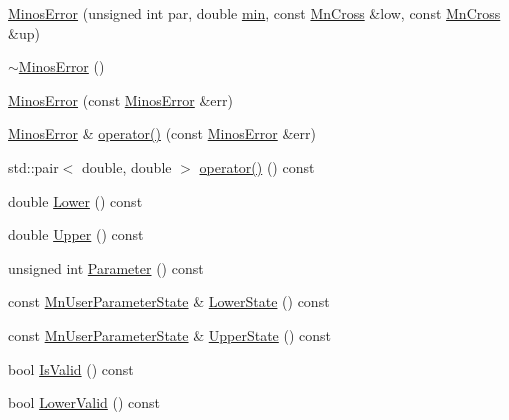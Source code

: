 \begin{DoxyCompactItemize}
\item 
\mbox{\hyperlink{classROOT_1_1Minuit2_1_1MinosError_a400609986f7b4e3a93eab1a35e1f33ce}{Minos\+Error}} (unsigned int par, double \mbox{\hyperlink{SU3__internal_8h_ab0f5fed3171eb00d1c5f037d9f518a23}{min}}, const \mbox{\hyperlink{classROOT_1_1Minuit2_1_1MnCross}{Mn\+Cross}} \&low, const \mbox{\hyperlink{classROOT_1_1Minuit2_1_1MnCross}{Mn\+Cross}} \&up)
\item 
\mbox{\hyperlink{classROOT_1_1Minuit2_1_1MinosError_a8373afe22cd395ed995a061691c48dad}{$\sim$\+Minos\+Error}} ()
\item 
\mbox{\hyperlink{classROOT_1_1Minuit2_1_1MinosError_a95d558825494f594da873fef3518572e}{Minos\+Error}} (const \mbox{\hyperlink{classROOT_1_1Minuit2_1_1MinosError}{Minos\+Error}} \&err)
\item 
\mbox{\hyperlink{classROOT_1_1Minuit2_1_1MinosError}{Minos\+Error}} \& \mbox{\hyperlink{classROOT_1_1Minuit2_1_1MinosError_ac45b7f3397fe4c13e1811b486e10602a}{operator()}} (const \mbox{\hyperlink{classROOT_1_1Minuit2_1_1MinosError}{Minos\+Error}} \&err)
\item 
std\+::pair$<$ double, double $>$ \mbox{\hyperlink{classROOT_1_1Minuit2_1_1MinosError_ae5c75a96400736de9741f6c5b8314e31}{operator()}} () const
\item 
double \mbox{\hyperlink{classROOT_1_1Minuit2_1_1MinosError_ac412aab9b0a59a427fbe7e3cfad47f0c}{Lower}} () const
\item 
double \mbox{\hyperlink{classROOT_1_1Minuit2_1_1MinosError_a0223fde13608aadee1f15b51d15b2bf6}{Upper}} () const
\item 
unsigned int \mbox{\hyperlink{classROOT_1_1Minuit2_1_1MinosError_a5d4ac177a8075a3698dbecac3a8c552b}{Parameter}} () const
\item 
const \mbox{\hyperlink{classROOT_1_1Minuit2_1_1MnUserParameterState}{Mn\+User\+Parameter\+State}} \& \mbox{\hyperlink{classROOT_1_1Minuit2_1_1MinosError_ac10a407a1cb13f4e0c1b4d21383d15df}{Lower\+State}} () const
\item 
const \mbox{\hyperlink{classROOT_1_1Minuit2_1_1MnUserParameterState}{Mn\+User\+Parameter\+State}} \& \mbox{\hyperlink{classROOT_1_1Minuit2_1_1MinosError_a89164c38dd7596c3164f1083eb9aac72}{Upper\+State}} () const
\item 
bool \mbox{\hyperlink{classROOT_1_1Minuit2_1_1MinosError_af6b7accfe397a06417ecc1f989d82e00}{Is\+Valid}} () const
\item 
bool \mbox{\hyperlink{classROOT_1_1Minuit2_1_1MinosError_a4b8c37c90bb53d98d3b4364a5ebc2228}{Lower\+Valid}} () const

\end{DoxyCompactItemize}
